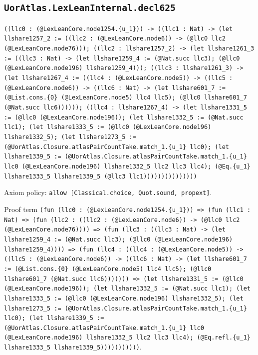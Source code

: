 \documentclass[11pt]{article}
\begin{document}
\subsection*{\texttt{UorAtlas.LexLeanInternal.decl625}}
\noindent\texttt{((llc0 : (@LexLeanCore.node1254.\{u\_1\})) -> ((llc1 : Nat) -> (let llshare1257\_2 := ((llc2 : (@LexLeanCore.node6)) -> (@llc0 llc2 (@LexLeanCore.node76))); ((llc2 : llshare1257\_2) -> (let llshare1261\_3 := ((llc3 : Nat) -> (let llshare1259\_4 := (@Nat.succ llc3); (@llc0 (@LexLeanCore.node196) llshare1259\_4))); ((llc3 : llshare1261\_3) -> (let llshare1267\_4 := ((llc4 : (@LexLeanCore.node5)) -> ((llc5 : (@LexLeanCore.node6)) -> ((llc6 : Nat) -> (let llshare601\_7 := (@List.cons.\{0\} (@LexLeanCore.node5) llc4 llc5); (@llc0 llshare601\_7 (@Nat.succ llc6)))))); ((llc4 : llshare1267\_4) -> (let llshare1331\_5 := (@llc0 (@LexLeanCore.node196)); (let llshare1332\_5 := (@Nat.succ llc1); (let llshare1333\_5 := (@llc0 (@LexLeanCore.node196) llshare1332\_5); (let llshare1273\_5 := (@UorAtlas.Closure.atlasPairCountTake.match\_1.\{u\_1\} llc0); (let llshare1339\_5 := (@UorAtlas.Closure.atlasPairCountTake.match\_1.\{u\_1\} llc0 (@LexLeanCore.node196) llshare1332\_5 llc2 llc3 llc4); (@Eq.\{u\_1\} llshare1333\_5 llshare1339\_5 (@llc3 llc1)))))))))))))))}\par
\noindent Axiom policy: \texttt{allow [Classical.choice, Quot.sound, propext]}.\par
\noindent Proof term \texttt{(fun (llc0 : (@LexLeanCore.node1254.\{u\_1\})) => (fun (llc1 : Nat) => (fun (llc2 : ((llc2 : (@LexLeanCore.node6)) -> (@llc0 llc2 (@LexLeanCore.node76)))) => (fun (llc3 : ((llc3 : Nat) -> (let llshare1259\_4 := (@Nat.succ llc3); (@llc0 (@LexLeanCore.node196) llshare1259\_4)))) => (fun (llc4 : ((llc4 : (@LexLeanCore.node5)) -> ((llc5 : (@LexLeanCore.node6)) -> ((llc6 : Nat) -> (let llshare601\_7 := (@List.cons.\{0\} (@LexLeanCore.node5) llc4 llc5); (@llc0 llshare601\_7 (@Nat.succ llc6))))))) => (let llshare1331\_5 := (@llc0 (@LexLeanCore.node196)); (let llshare1332\_5 := (@Nat.succ llc1); (let llshare1333\_5 := (@llc0 (@LexLeanCore.node196) llshare1332\_5); (let llshare1273\_5 := (@UorAtlas.Closure.atlasPairCountTake.match\_1.\{u\_1\} llc0); (let llshare1339\_5 := (@UorAtlas.Closure.atlasPairCountTake.match\_1.\{u\_1\} llc0 (@LexLeanCore.node196) llshare1332\_5 llc2 llc3 llc4); (@Eq.refl.\{u\_1\} llshare1333\_5 llshare1339\_5)))))))))))}.\par
\end{document}
